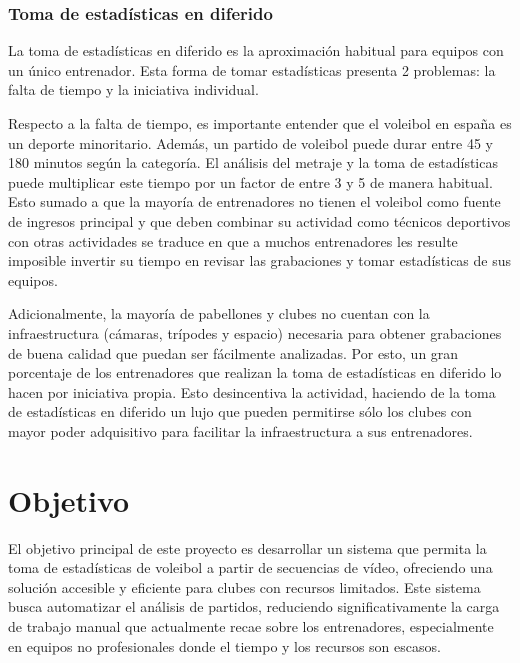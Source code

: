 \documentclass[12pt]{report} %
\begin{document}
    \subsection{Toma de estadísticas en diferido}

    La toma de estadísticas en diferido es la aproximación habitual para
    equipos con un único entrenador. Esta forma de tomar estadísticas presenta
    2 problemas: la falta de tiempo y la iniciativa individual.

    Respecto a la falta de tiempo, es importante entender que el voleibol en
    españa es un deporte minoritario. Además, un partido de voleibol puede durar
    entre 45 y 180 minutos según la categoría. El análisis del metraje y la
    toma de estadísticas puede multiplicar este tiempo por un factor de entre 3
    y 5 de manera habitual. Esto sumado a que la mayoría de entrenadores no
    tienen el voleibol como fuente de ingresos principal y que deben combinar
    su actividad como técnicos deportivos con otras actividades se
    traduce en que a muchos entrenadores les resulte imposible invertir su
    tiempo en revisar las grabaciones y tomar estadísticas de sus equipos.

    Adicionalmente, la mayoría de pabellones y clubes no cuentan con la
    infraestructura (cámaras, trípodes y espacio) necesaria para obtener
    grabaciones de buena calidad que puedan ser fácilmente analizadas. Por esto, 
    un gran porcentaje de los entrenadores que realizan la toma de estadísticas
    en diferido lo hacen por iniciativa propia. Esto desincentiva la actividad,
    haciendo de la toma de estadísticas en diferido un lujo que pueden
    permitirse sólo los clubes con mayor poder adquisitivo para facilitar la
    infraestructura a sus entrenadores.
    
    
    \chapter{Objetivo}
    \label{chap:metodos}

    El objetivo principal de este proyecto es desarrollar un sistema que
    permita la toma de estadísticas de voleibol a partir de secuencias de
    vídeo, ofreciendo una solución accesible y eficiente para clubes con
    recursos limitados. Este sistema busca automatizar el análisis de partidos,
    reduciendo significativamente la carga de trabajo manual que actualmente
    recae sobre los entrenadores, especialmente en equipos no profesionales
    donde el tiempo y los recursos son escasos.
\end{document}
